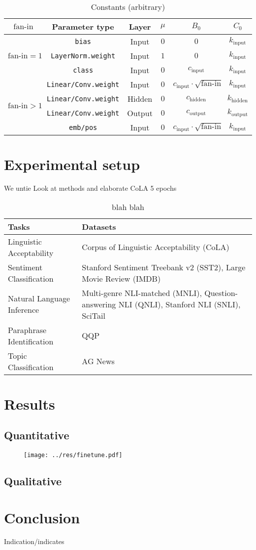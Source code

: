 \documentclass{article}
\newcommand{\fanin}{\text{fan-in}}
\newcommand{\cinput}{c_{\text{input}}}
\newcommand{\chidden}{c_{\text{hidden}}}
\newcommand{\coutput}{c_{\text{output}}}
\newcommand{\kinput}{k_{\text{input}}}
\newcommand{\khidden}{k_{\text{hidden}}}
\newcommand{\koutput}{k_{\text{output}}}
\begin{document}
\begin{table}[h!]
\Centering
\begin{tabular}{cccccc}
\toprule
    $\fanin$ & Parameter type & Layer & $\mu$ & $B_0$ & $C_0$\\
\midrule
\multirow{3}{*}{$\fanin=1$} & \texttt{bias} & Input & $0$ & $0$ & $\kinput$\\
& \texttt{LayerNorm.weight}  & Input & $1$ & $0$ & $\kinput$\\
& \texttt{class}  & Input & $0$ & $\cinput$ & $\kinput$\\
\cmidrule{1-6}
\multirow{4}{*}{$\fanin>1$} & \texttt{Linear/Conv.weight}  & Input & $0$ & $\cinput \cdot \sqrt{\fanin}$ & $\kinput$\\
& \texttt{Linear/Conv.weight}  & Hidden & $0$ & $\chidden$ & $\khidden$\\
& \texttt{Linear/Conv.weight}  & Output & $0$ & $\coutput$ & $\koutput$\\
\cmidrule{2-6}
& \texttt{emb/pos} & Input & $0$ & $\cinput \cdot \sqrt{\fanin}$ & $\kinput$\\
\bottomrule
\end{tabular}
\caption{Constants (arbitrary)}
\end{table}


\section{Experimental setup}
We untie
Look at methods and elaborate
CoLA 5 epochs

\begin{table}[h!]
\Centering
\begin{tabular}{lp{20em}}
\toprule
\textbf{Tasks} & \textbf{Datasets} \\
\midrule
Linguistic Acceptability & Corpus of Linguistic Acceptability (CoLA) \\
Sentiment Classification & Stanford Sentiment Treebank v2 (SST2), Large Movie Review (IMDB) \\
Natural Language Inference & Multi-genre NLI-matched (MNLI), Question-answering NLI (QNLI), Stanford NLI (SNLI), SciTail \\
Paraphrase Identification & QQP \\
Topic Classification & AG News \\
\bottomrule
\end{tabular}
\caption{blah blah}
\end{table}

\section{Results}
\subsection{Quantitative}
\begin{figure}
\texttt{[image: ../res/finetune.pdf]}
\end{figure}

\subsection{Qualitative}

\section{Conclusion}
Indication/indicates

\printbibliography
\end{document}
